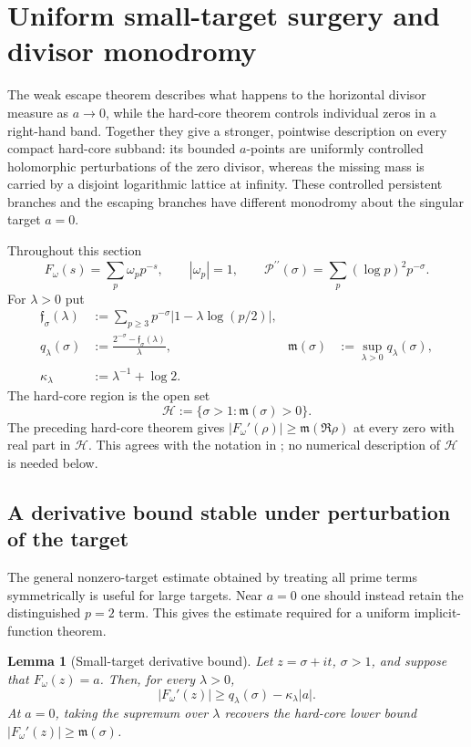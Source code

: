 \documentclass[11pt]{article}
\newtheorem{lemma}[theorem]{Lemma}
\theoremstyle{definition}
\theoremstyle{remark}
\newcommand{\cP}{\mathcal P}
\begin{document}
\section{Uniform small-target surgery and divisor monodromy}
\label{sec:small-target-surgery}

The weak escape theorem describes what happens to the horizontal divisor measure as
$a\to0$, while the hard-core theorem controls individual zeros in a right-hand band.
Together they give a stronger, pointwise description on every compact hard-core
subband: its bounded $a$-points are uniformly controlled holomorphic perturbations of
the zero divisor, whereas the missing mass is carried by a disjoint logarithmic lattice
at infinity.  These controlled persistent branches and the escaping branches have
different monodromy about the singular target $a=0$.

Throughout this section
\[
 F_\omega(s)=\sum_p\omega_pp^{-s},\qquad |\omega_p|=1,
 \qquad
 \cP^{\prime\prime}(\sigma)=\sum_p(\log p)^2p^{-\sigma}.
\]
For $\lambda>0$ put
\begin{align}
 \mathfrak f_\sigma(\lambda)
   &:=\sum_{p\ge3}p^{-\sigma}\left|1-\lambda\log(p/2)\right|,\label{eq:st-f}\tag{ST.1}\\
 q_\lambda(\sigma)
   &:=\frac{2^{-\sigma}-\mathfrak f_\sigma(\lambda)}{\lambda},
 &
 \mathfrak m(\sigma)&:=\sup_{\lambda>0}q_\lambda(\sigma),\label{eq:st-q}\tag{ST.2}\\
 \kappa_\lambda&:=\lambda^{-1}+\log2.
 \label{eq:st-kappa}\tag{ST.3}
\end{align}
The hard-core region is the open set
\[
 \mathcal H:=\{\sigma>1:\mathfrak m(\sigma)>0\}.
\]
The preceding hard-core theorem gives
$|F_\omega'(\rho)|\ge \mathfrak m(\Re\rho)$ at every zero with real part in
$\mathcal H$.  This agrees with the notation in
; no numerical description of $\mathcal H$ is needed below.

\subsection{A derivative bound stable under perturbation of the target}

The general nonzero-target estimate obtained by treating all prime terms symmetrically
is useful for large targets.  Near $a=0$ one should instead retain the distinguished
$p=2$ term.  This gives the estimate required for a uniform implicit-function theorem.

\begin{lemma}[Small-target derivative bound]
\label{lem:small-target-slope}
Let $z=\sigma+it$, $\sigma>1$, and suppose that $F_\omega(z)=a$.  Then, for every
$\lambda>0$,
\[
 \boxed{
 |F_\omega'(z)|
 \ge q_\lambda(\sigma)-\kappa_\lambda|a|.
 }
\tag{ST.4}
\]
At $a=0$, taking the supremum over $\lambda$ recovers the hard-core lower bound
$|F_\omega'(z)|\ge \mathfrak m(\sigma)$.
\end{lemma}
\end{document}
